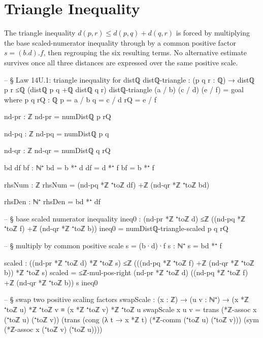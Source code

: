 \documentclass[11pt,a4paper]{book}
\def\cdot{.}%
\begin{document}
\section{Triangle Inequality}

The triangle inequality $d(p,r) \le d(p,q) + d(q,r)$ is forced by
multiplying the base scaled-numerator inequality through by a common
positive factor $s = (b \cdot d) \cdot f$, then regrouping the six
resulting terms.  No alternative estimate survives once all three distances are
expressed over the same positive scale.

\begin{code}
-- § Law 14U.1: triangle inequality for distℚ
distℚ-triangle : (p q r : ℚ) → distℚ p r ≤ℚ (distℚ p q +ℚ distℚ q r)
distℚ-triangle (a / b) (c / d) (e / f) =
  goal
  where
    p q rQ : ℚ
    p = a / b
    q = c / d
    rQ = e / f

    nd-pr : ℤ
    nd-pr = numDistℚ p rQ

    nd-pq : ℤ
    nd-pq = numDistℚ p q

    nd-qr : ℤ
    nd-qr = numDistℚ q rQ

    bd df bf : ℕ⁺
    bd = b *⁺ d
    df = d *⁺ f
    bf = b *⁺ f

    rhsNum : ℤ
    rhsNum = (nd-pq *ℤ ⁺toℤ df) +ℤ (nd-qr *ℤ ⁺toℤ bd)

    rhsDen : ℕ⁺
    rhsDen = bd *⁺ df

    -- § base scaled numerator inequality
    ineq0 : (nd-pr *ℤ ⁺toℤ d) ≤ℤ ((nd-pq *ℤ ⁺toℤ f) +ℤ (nd-qr *ℤ ⁺toℤ b))
    ineq0 = numDistℚ-triangle-scaled p q rQ

    -- § multiply by common positive scale s = (b·d)·f
    s : ℕ⁺
    s = bd *⁺ f

    scaled : ((nd-pr *ℤ ⁺toℤ d) *ℤ ⁺toℤ s)
              ≤ℤ
             (((nd-pq *ℤ ⁺toℤ f) +ℤ (nd-qr *ℤ ⁺toℤ b)) *ℤ ⁺toℤ s)
    scaled =
      ≤ℤ-mul-pos-right
        (nd-pr *ℤ ⁺toℤ d)
        ((nd-pq *ℤ ⁺toℤ f) +ℤ (nd-qr *ℤ ⁺toℤ b))
        s
        ineq0

    -- § swap two positive scaling factors
    swapScale : (x : ℤ) → (u v : ℕ⁺) → (x *ℤ ⁺toℤ u) *ℤ ⁺toℤ v ≡ (x *ℤ ⁺toℤ v) *ℤ ⁺toℤ u
    swapScale x u v =
      trans
        (*ℤ-assoc x (⁺toℤ u) (⁺toℤ v))
        (trans
          (cong (λ t → x *ℤ t) (*ℤ-comm (⁺toℤ u) (⁺toℤ v)))
          (sym (*ℤ-assoc x (⁺toℤ v) (⁺toℤ u))))


\end{code}
\end{document}
